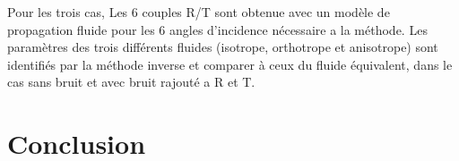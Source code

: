 \documentclass[12pt]{report}
\begin{document}
  
    Pour les trois cas, Les 6 couples R/T sont obtenue avec un modèle de propagation fluide pour les 6 angles d'incidence nécessaire a la méthode. Les paramètres des trois différents fluides (isotrope, orthotrope et anisotrope) sont identifiés par la méthode inverse et comparer à ceux du fluide équivalent, dans le cas sans bruit et avec bruit rajouté a R et T. 
\chapter*{Conclusion}
\end{document}
